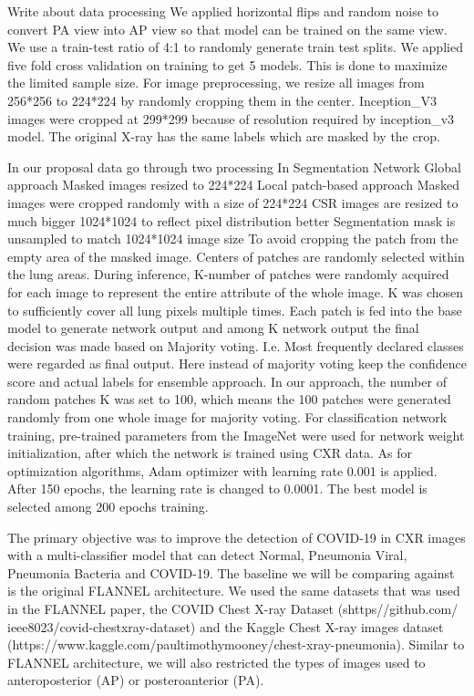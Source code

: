 \documentclass{sigkddExp}
\begin{document}
Write about data processing We applied horizontal flips and random noise to
convert PA view into AP view so that model can be trained on the same view. We
use a train-test ratio of 4:1 to randomly generate train test splits. We applied
five fold cross validation on training to get 5 models. This is done to maximize
the limited sample size. For image preprocessing, we resize all images from
256*256 to 224*224 by randomly cropping them in the center. Inception\_V3 images
were cropped at 299*299 because of resolution required by inception\_v3 model.
The original X-ray has the same labels which are masked by the crop.

In our proposal data go through two processing In Segmentation Network Global
approach Masked images resized to 224*224 Local patch-based approach Masked
images were cropped randomly with a size of 224*224 CSR images are resized to
much bigger 1024*1024 to reflect pixel distribution better Segmentation mask is
unsampled to match 1024*1024 image size To avoid cropping the patch from the
empty area of the masked image. Centers of patches are randomly selected within
the lung areas. During inference, K-number of patches were randomly acquired for
each image to represent the entire attribute of the whole image. K was chosen to
sufficiently cover all lung pixels multiple times. Each patch is fed into the
base model to generate network output and among K network output the final
decision was made based on Majority voting. I.e. Most frequently declared
classes were regarded as final output. Here instead of majority voting keep the
confidence score and actual labels for ensemble approach. In our approach, the
number of random patches K was set to 100, which means the 100 patches were
generated randomly from one whole image for majority voting. For classification
network training, pre-trained parameters from the ImageNet were used for network
weight initialization, after which the network is trained using CXR data. As for
optimization algorithms, Adam optimizer with learning rate 0.001 is applied.
After 150 epochs, the learning rate is changed to 0.0001. The best model is
selected among 200 epochs training.

The primary objective was to improve the detection of COVID-19 in CXR images
with a multi-classifier model that can detect Normal, Pneumonia Viral, Pneumonia
Bacteria and COVID-19. The baseline we will be comparing against is the original
FLANNEL architecture. We used the same datasets that was used in the FLANNEL
paper, the COVID Chest X-ray Dataset (shttps\://github.com/
ieee8023/covid-chestxray-dataset) and the Kaggle Chest X-ray images dataset
(https://www.kaggle.com/paultimothymooney/chest-xray-pneumonia). Similar to
FLANNEL architecture, we will also restricted the types of images used to
anteroposterior (AP) or posteroanterior (PA).
\end{document}
